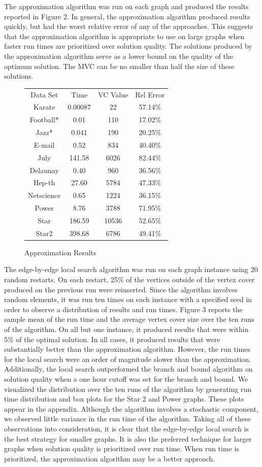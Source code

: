 \documentclass{sig-alternate-05-2015}
\begin{document}
The approximation algorithm was run on each graph and produced the results reported in Figure 2. In general, the approximation algorithm produced results quickly, but had the worst relative error of any of the approaches. This suggests that the approximation algorithm is appropriate to use on large graphs when faster run times are prioritized over solution quality. The solutions produced by the approximation algorithm serve as a lower bound on the quality of the optimum solution. The MVC can be no smaller than half the size of these solutions.

\begin{figure}
\centering
\caption{Approximation Results}
\begin{tabular}{c c c c}
Data Set & Time & VC Value & Rel Error \\
Karate & 0.00087 & 22 & 57.14\% \\
Football* & 0.01 & 110 & 17.02\% \\
Jazz* & 0.041 & 190 & 20.25\% \\
E-mail & 0.52 & 834 & 40.40\% \\
July & 141.58  & 6026 & 82.44\% \\
Delaunay & 0.40 & 960 & 36.56\% \\
Hep-th & 27.60 & 5784 & 47.33\% \\
Netscience & 0.65 & 1224 & 36.15\% \\
Power & 8.76 & 3788 & 71.95\% \\
Star & 186.59 & 10536 & 52.65\% \\
Star2 & 398.68 & 6786 & 49.41\%
\end{tabular}
\end{figure}

The edge-by-edge local search algorithm was run on each graph instance using 20 random restarts. On each restart, 25\% of the vertices outside of the vertex cover produced on the previous run were reinserted. Since the algorithm involves random elements, it was run ten times on each instance with a specified seed in order to observe a distribution of results and run times. Figure 3 reports the sample mean of the run time and the average vertex cover size over the ten runs of the algorithm. On all but one instance, it produced results that were within 5\% of the optimal solution. In all cases, it produced results that were substantially better than the approximation algorithm. However, the run times for the local search were an order of magnitude slower than the approximation. Additionally, the local search outperformed the branch and bound algorithm on solution quality when a one hour cutoff was set for the branch and bound. We visualized the distribution over the ten runs of the algorithm by generating run time distribution and box plots for the Star 2 and Power graphs. These plots appear in the appendix. Although the algorithm involves a stochastic component, we observed little variance in the run time of the algorithm. Taking all of these observations into consideration, it is clear that the edge-by-edge local search is the best strategy for smaller graphs. It is also the preferred technique for larger graphs when solution quality is prioritized over run time. When run time is prioritized, the approximation algorithm may be a better approach.
\end{document}
